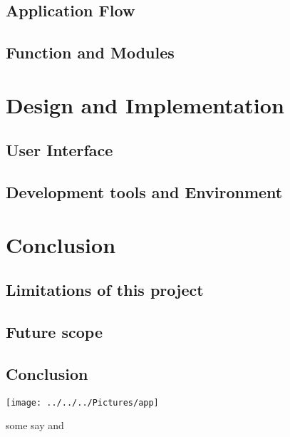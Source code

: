 \documentclass[a4paper, 12pt, openany]{report}
\begin{document}
	\section{Application Flow}
	\section{Function and Modules}
	
	\chapter{Design and Implementation}
	\section{User Interface}
	\section{Development tools and Environment}
	
	\chapter{Conclusion}
	\section{Limitations of this project}
	\section{Future scope}
	\section{Conclusion}
	\begin{center}
		\texttt{[image: ../../../Pictures/app]} %
	\end{center}
	some say \cite{doe2020signal} and \cite{smithe2019quantum}
	
	
	
	
\end{document}
